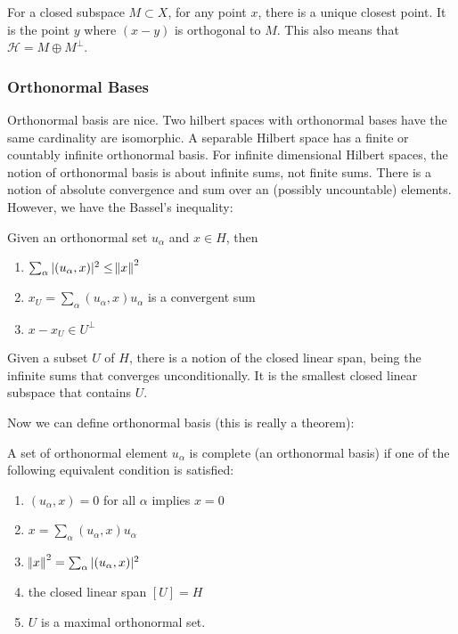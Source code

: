 \documentclass[main.tex]{subfiles}
\begin{document}
\begin{theorem}[Projection]
For a closed subspace $M \subset X$, for any point $x$, there is a unique closest point. It is the point $y$ where $(x - y)$ is orthogonal to $M$. This also means that $\mathcal{H} = M \oplus M^\perp$.

\subsubsection{Orthonormal Bases}
Orthonormal basis are nice. Two hilbert spaces with orthonormal bases have the same cardinality are isomorphic. A separable Hilbert space has a finite or countably infinite orthonormal basis. For infinite dimensional Hilbert spaces, the notion of orthonormal basis is about infinite sums, not finite sums. There is a notion of absolute convergence and sum over an (possibly uncountable) elements. 
However, we have the Bassel's inequality:

\begin{theorem}
Given an orthonormal set $u_\alpha$ and $x \in H$, then \begin{enumerate}
    \item $\sum_{\alpha} |(u_\alpha, x)|^2 \leq \norm{x}^2$
    \item $x_U = \sum_\alpha (u_\alpha, x)u_\alpha$ is a convergent sum
    \item $x - x_U \in U^\perp$
\end{enumerate}
\end{theorem}

Given a subset $U$ of $H$, there is a notion of the closed linear span, being the infinite sums that converges unconditionally. It is the smallest closed linear subspace that contains $U$.

Now we can define orthonormal basis (this is really a theorem):

\begin{definition}
A set of orthonormal element $u_\alpha$ is complete (an orthonormal basis) if one of the following equivalent condition is satisfied:
\begin{enumerate}
    \item $(u_\alpha, x) = 0$ for all $\alpha$ implies $x = 0$
    \item $x = \sum_\alpha (u_\alpha, x) u_\alpha$
    \item $\norm{x}^2 = \sum_\alpha |(u_\alpha, x)|^2$
    \item the closed linear span $[U] = H$
    \item $U$ is a maximal orthonormal set.
\end{enumerate}
\end{definition}


\end{theorem}
\end{document}
